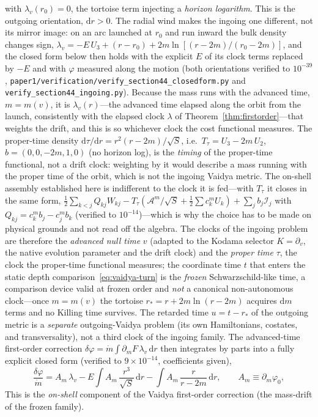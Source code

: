 \documentclass[12pt]{iopart}
\newcommand{\dd}{\mathrm{d}}
\theoremstyle{plain}
\theoremstyle{definition}
\theoremstyle{plain}
\theoremstyle{remark}
\begin{document}
with $\lambda_v(r_0)=0$, the tortoise term injecting a \emph{horizon logarithm}. This is
the outgoing orientation, $\dd r>0$. The radial wind makes the ingoing one different, not
its mirror image: on an arc launched at $r_0$ and run inward the bulk density changes
sign, $\lambda_v=-E\,U_3+(r-r_0)+2m\ln[(r-2m)/(r_0-2m)]$, and the closed form below then
holds with the explicit $E$ of its clock terms replaced by $-E$ and with $\varphi$
measured along the motion (both orientations verified to $10^{-39}$,
\texttt{paper1/verification/verify\_section44\_closedform.py} and
\texttt{verify\_section44\_ingoing.py}). Because the
mass runs with the advanced time, $m=m(v)$, it is $\lambda_v(r)$---the advanced time elapsed
along the orbit from the launch, consistently with the elapsed clock $\lambda$ of
Theorem~\ref{thm:firstorder}---that weights the drift, and this is so whichever clock the cost
functional measures. The proper-time density $\dd\tau/\dd r=r^2(r-2m)/\sqrt S$,
i.e.\ $T_\tau=U_3-2m\,U_2$, $b=(0,0,-2m,1,0)$ (no horizon log), is the
\emph{timing} of the proper-time functional, not a drift clock: weighting by it
would describe a mass running with the proper time of the orbit, which is not the
ingoing Vaidya metric. The on-shell assembly established here is indifferent to the
clock it is fed---with $T_\tau$ it closes in the same form,
$\tfrac12\sum_{k<j}Q_{kj}W_{kj}-T_\tau(\mathcal{A}^m/\sqrt S+\tfrac12\sum c_k^m U_k)
+\sum_j b_j\mathcal{I}_j$ with $Q_{kj}=c_k^m b_j-c_j^m b_k$ (verified to
$10^{-14}$)---which is why the choice has to be made on physical grounds and not
read off the algebra. The clocks of the ingoing problem are therefore the
\emph{advanced null time} $v$ (adapted to the Kodama selector $K=\partial_v$, the
native evolution parameter and the drift clock) and the \emph{proper time} $\tau$,
the clock the proper-time functional measures; the coordinate time
$t$ that enters the static depth comparison~\eqref{eq:vaidya-turn} is the
\emph{frozen} Schwarzschild-like time, a comparison device valid at frozen order and
\emph{not} a canonical non-autonomous clock---once $m=m(v)$ the tortoise
$r_*=r+2m\ln(r-2m)$ acquires $\dd m$ terms and no Killing time survives. The retarded
time $u=t-r_*$ of the outgoing metric is a \emph{separate} outgoing-Vaidya problem
(its own Hamiltonians, costates, and transversality), not a third clock of the ingoing
family. The advanced-time first-order correction
$\delta\varphi=\dot m\!\int\!\partial_m F\,\lambda_v\,\dd r$ then integrates by parts into a
fully explicit closed form (verified to $9\times10^{-14}$, coefficients given),
\begin{equation}
    \frac{\delta\varphi}{\dot m}
    =A_m\,\lambda_v-E\!\int\! A_m\,\frac{r^3}{\sqrt S}\,\dd r
    -\int\! A_m\,\frac{r}{r-2m}\,\dd r,\qquad A_m\equiv\partial_m\varphi_0,
    \label{eq:vaidya-deltaphi}
\end{equation}
This is the \emph{on-shell} component of the Vaidya first-order correction (the
mass-drift of the frozen family).
\end{document}
